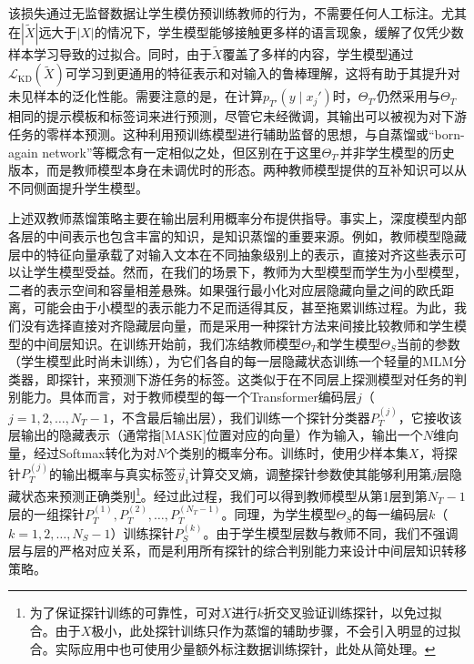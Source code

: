 \documentclass[../main.tex]{subfiles}
\begin{document}
该损失通过无监督数据让学生模仿预训练教师的行为，不需要任何人工标注。尤其在$|\tilde{X}|$远大于$|X|$的情况下，学生模型能够接触更多样的语言现象，缓解了仅凭少数样本学习导致的过拟合。同时，由于$\tilde{X}$覆盖了多样的内容，学生模型通过$\mathcal{L}_{\text{KD}}(\tilde{X})$可学习到更通用的特征表示和对输入的鲁棒理解，这将有助于其提升对未见样本的泛化性能。需要注意的是，在计算$p_{T'}(y \mid x_j')$时，$\Theta_{T'}$仍然采用与$\Theta_T$相同的提示模板和标签词来进行预测，尽管它未经微调，其输出可以被视为对下游任务的零样本预测。这种利用预训练模型进行辅助监督的思想，与自蒸馏或“born-again network”等概念有一定相似之处，但区别在于这里$\Theta_{T'}$并非学生模型的历史版本，而是教师模型本身在未调优时的形态。两种教师模型提供的互补知识可以从不同侧面提升学生模型。

\label{sec:3-3-2}
上述双教师蒸馏策略主要在输出层利用概率分布提供指导。事实上，深度模型内部各层的中间表示也包含丰富的知识，是知识蒸馏的重要来源。例如，教师模型隐藏层中的特征向量承载了对输入文本在不同抽象级别上的表示，直接对齐这些表示可以让学生模型受益。然而，在我们的场景下，教师为大型模型而学生为小型模型，二者的表示空间和容量相差悬殊。如果强行最小化对应层隐藏向量之间的欧氏距离，可能会由于小模型的表示能力不足而适得其反，甚至拖累训练过程。为此，我们没有选择直接对齐隐藏层向量，而是采用一种探针方法来间接比较教师和学生模型的中间层知识。在训练开始前，我们冻结教师模型$\Theta_T$和学生模型$\Theta_S$当前的参数（学生模型此时尚未训练），为它们各自的每一层隐藏状态训练一个轻量的MLM分类器，即探针，来预测下游任务的标签。这类似于在不同层上探测模型对任务的判别能力。具体而言，对于教师模型的每一个Transformer编码层$j$（$j=1,2,\dots,N_T-1$，不含最后输出层），我们训练一个探针分类器$P_T^{(j)}$，它接收该层输出的隐藏表示（通常指[MASK]位置对应的向量）作为输入，输出一个$N$维向量，经过Softmax转化为对$N$个类别的概率分布。训练时，使用少样本集$X$，将探针$P_T^{(j)}$的输出概率与真实标签$\vec{y}_i$计算交叉熵，调整探针参数使其能够利用第$j$层隐藏状态来预测正确类别\footnote{为了保证探针训练的可靠性，可对$X$进行$k$折交叉验证训练探针，以免过拟合。由于$X$极小，此处探针训练只作为蒸馏的辅助步骤，不会引入明显的过拟合。实际应用中也可使用少量额外标注数据训练探针，此处从简处理。}。经过此过程，我们可以得到教师模型从第1层到第$N_T-1$层的一组探针${P_T^{(1)}, P_T^{(2)}, \dots, P_T^{(N_T-1)}}$。同理，为学生模型$\Theta_S$的每一编码层$k$（$k=1,2,\dots,N_S-1$）训练探针$P_S^{(k)}$。由于学生模型层数与教师不同，我们不强调层与层的严格对应关系，而是利用所有探针的综合判别能力来设计中间层知识转移策略。
\end{document}
